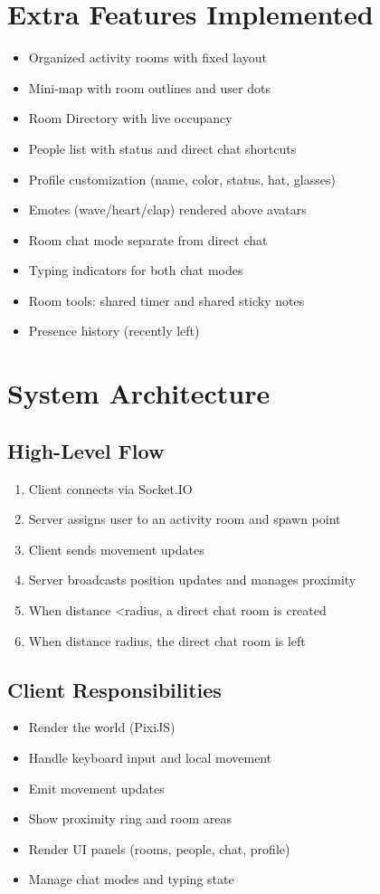 \documentclass[11pt]{article}
\begin{document}
\section{Extra Features Implemented}
\begin{itemize}[leftmargin=*]
  \item Organized activity rooms with fixed layout
  \item Mini-map with room outlines and user dots
  \item Room Directory with live occupancy
  \item People list with status and direct chat shortcuts
  \item Profile customization (name, color, status, hat, glasses)
  \item Emotes (wave/heart/clap) rendered above avatars
  \item Room chat mode separate from direct chat
  \item Typing indicators for both chat modes
  \item Room tools: shared timer and shared sticky notes
  \item Presence history (recently left)
\end{itemize}

\section{System Architecture}
\subsection{High-Level Flow}
\begin{enumerate}[leftmargin=*]
  \item Client connects via Socket.IO
  \item Server assigns user to an activity room and spawn point
  \item Client sends movement updates
  \item Server broadcasts position updates and manages proximity
  \item When distance \textless radius, a direct chat room is created
  \item When distance \ge radius, the direct chat room is left
\end{enumerate}

\subsection{Client Responsibilities}
\begin{itemize}[leftmargin=*]
  \item Render the world (PixiJS)
  \item Handle keyboard input and local movement
  \item Emit movement updates
  \item Show proximity ring and room areas
  \item Render UI panels (rooms, people, chat, profile)
  \item Manage chat modes and typing state
\end{itemize}
\end{document}
